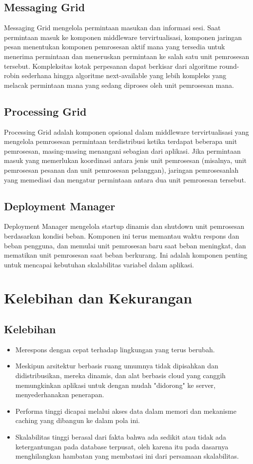 \documentclass[a4paper]{report}
\begin{document}
	\subsection*{\LARGE{Messaging Grid}}
	\large Messaging Grid mengelola permintaan masukan dan informasi sesi. Saat permintaan masuk ke komponen middleware tervirtualisasi, komponen jaringan pesan menentukan komponen pemrosesan aktif mana yang tersedia untuk menerima permintaan dan meneruskan permintaan ke salah satu unit pemrosesan tersebut. Kompleksitas kotak perpesanan dapat berkisar dari algoritme round-robin sederhana hingga algoritme next-available yang lebih kompleks yang melacak permintaan mana yang sedang diproses oleh unit pemrosesan mana.
	\subsection*{\LARGE{Processing Grid}}
	\large Processing Grid adalah komponen opsional dalam middleware tervirtualisasi yang mengelola pemrosesan permintaan terdistribusi ketika terdapat beberapa unit pemrosesan, masing-masing menangani sebagian dari aplikasi. Jika permintaan masuk yang memerlukan koordinasi antara jenis unit pemrosesan (misalnya, unit pemrosesan pesanan dan unit pemrosesan pelanggan), jaringan pemrosesanlah yang memediasi dan mengatur permintaan antara dua unit pemrosesan tersebut.
	\subsection*{\LARGE{Deployment Manager}}
	\large Deployment Manager mengelola startup dinamis dan shutdown unit pemrosesan berdasarkan kondisi beban. Komponen ini terus memantau waktu respons dan beban pengguna, dan memulai unit pemrosesan baru saat beban meningkat, dan mematikan unit pemrosesan saat beban berkurang. Ini adalah komponen penting untuk mencapai kebutuhan skalabilitas variabel dalam aplikasi.
	\section*{\huge{Kelebihan dan Kekurangan}}
	\subsection*{\LARGE{Kelebihan}}
	\begin{itemize}
		\item \large Merespons dengan cepat terhadap lingkungan yang terus berubah.
		\item \large Meskipun arsitektur berbasis ruang umumnya tidak dipisahkan dan didistribusikan, mereka dinamis, dan alat berbasis cloud yang canggih memungkinkan aplikasi untuk dengan mudah "didorong" ke server, menyederhanakan penerapan.
		\item \large Performa tinggi dicapai melalui akses data dalam memori dan mekanisme caching yang dibangun ke dalam pola ini.
		\item \large Skalabilitas tinggi berasal dari fakta bahwa ada sedikit atau tidak ada ketergantungan pada database terpusat, oleh karena itu pada dasarnya menghilangkan hambatan yang membatasi ini dari persamaan skalabilitas.
	\end{itemize} 
\end{document}
